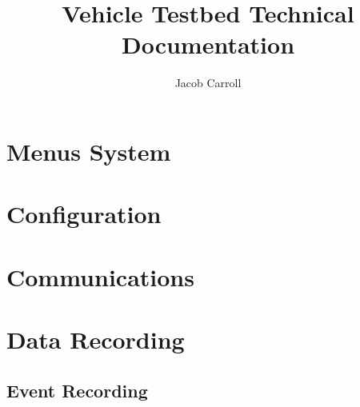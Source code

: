 \documentclass{article}
\title{Vehicle Testbed Technical Documentation}
\author{Jacob Carroll}
\date{ }
\begin{document}
 
\maketitle
 
\section{Menus System}

 
\section{Configuration}

 
\section{Communications}


\section{Data Recording}
\subsection{Event Recording}

\end{document}
